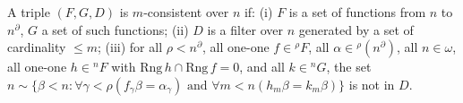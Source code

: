 A triple $(F, G, D)$ is $m$-consistent over $n$ if:
(i) $F$ is a set of functions from $n$ to $n^\partial$, $G$ a set of such functions;
(ii) $D$ is a filter over $n$ generated by a set of cardinality $\leq m$;
(iii) for all $\rho < n^\partial$, all one-one $f \in {}^\rho F$, all $\alpha \in {}^\rho(n^\partial)$, all $n \in \omega$, all one-one $h \in {}^n F$ with $\text{Rng}\,h \cap \text{Rng}\,f = 0$, and all $k \in {}^n G$, the set $n \sim \{\beta < n : \forall \gamma < \rho(f_\gamma \beta = \alpha_\gamma) \text{ and } \forall m < n(h_m \beta = k_m \beta)\}$ is not in $D$.
